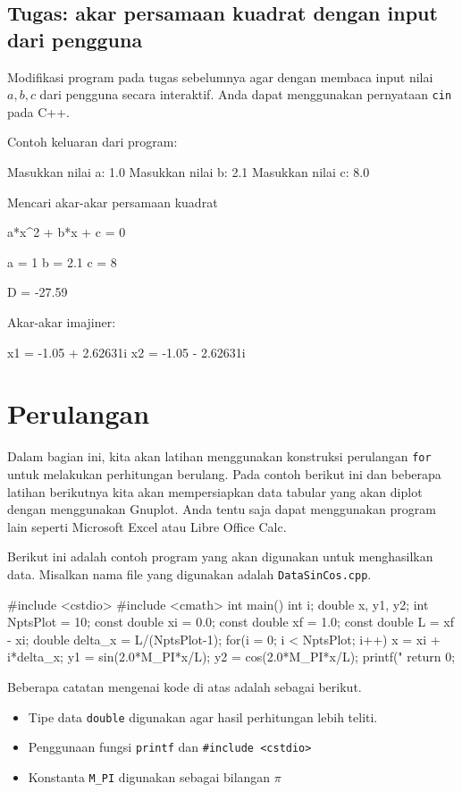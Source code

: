 \documentclass[a4paper,11pt]{extarticle}
\begin{document}
\subsection{Tugas: akar persamaan kuadrat dengan input dari pengguna}

Modifikasi program pada tugas sebelumnya agar dengan membaca input
nilai $a, b, c$ dari pengguna secara interaktif. Anda
dapat menggunakan pernyataan \texttt{cin} pada C++.

Contoh keluaran dari program:
\begin{textcode}
Masukkan nilai a: 1.0
Masukkan nilai b: 2.1
Masukkan nilai c: 8.0

Mencari akar-akar persamaan kuadrat

a*x^2 + b*x + c = 0

a = 1
b = 2.1
c = 8

D = -27.59

Akar-akar imajiner:

x1 = -1.05 + 2.62631i
x2 = -1.05 - 2.62631i
\end{textcode}


\section{Perulangan}
Dalam bagian ini, kita akan latihan menggunakan konstruksi perulangan \texttt{for}
untuk melakukan perhitungan berulang. Pada contoh berikut ini dan beberapa
latihan berikutnya kita akan mempersiapkan data tabular yang akan diplot
dengan menggunakan \textsf{Gnuplot}. Anda tentu saja dapat menggunakan program
lain seperti \textsf{Microsoft Excel} atau \textsf{Libre Office Calc}.

Berikut ini adalah contoh program yang akan digunakan untuk menghasilkan data.
Misalkan nama file yang digunakan adalah \texttt{DataSinCos.cpp}.
\begin{cppcode}
#include <cstdio>
#include <cmath>
int main()
{
  int i;
  double x, y1, y2;
  int NptsPlot = 10;
  const double xi = 0.0;
  const double xf = 1.0;
  const double L = xf - xi;
  double delta_x = L/(NptsPlot-1);
  for(i = 0; i < NptsPlot; i++) {
    x = xi + i*delta_x;
    y1 = sin(2.0*M_PI*x/L);
    y2 = cos(2.0*M_PI*x/L);
    printf("%
  }
  return 0;
}
\end{cppcode}

Beberapa catatan mengenai kode di atas adalah sebagai berikut.
\begin{itemize}
\item Tipe data \texttt{double} digunakan agar hasil perhitungan lebih teliti.
\item Penggunaan fungsi \texttt{printf} dan \texttt{\#include <cstdio>}
\item Konstanta \verb|M_PI| digunakan sebagai bilangan $\pi$
\end{itemize}
\end{document}
